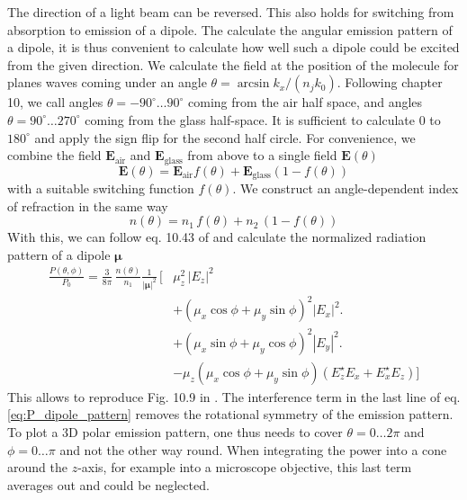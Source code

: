 The direction of  a light beam can be reversed. This also holds for switching from absorption to emission of a dipole. The calculate the angular emission pattern of a dipole, it is thus convenient to calculate how well such a dipole could be excited from the given direction. We calculate the field at the position of the molecule for planes waves coming under an angle $\theta = \arcsin k_x / (n_j k_0)$. Following \cite{Novotny-Hecht2012} chapter 10, we call angles $\theta = -90^\circ \dots 90^\circ$ coming from the air half space, and angles $\theta = 90^\circ \dots 270^\circ$ coming from the glass half-space. It is sufficient to calculate $0$ to $180^\circ$ and apply the sign flip for the second half circle. For convenience, we combine the field $\mathbf{E}_\text{air}$ and $\mathbf{E}_\text{glass}$ from above to a single field $\mathbf{E}(\theta)$
\begin{equation}
\mathbf{E}(\theta) = \mathbf{E}_\text{air} f(\theta) + \mathbf{E}_\text{glass} (1 - f(\theta))
\end{equation}
with a suitable switching function $f(\theta)$. We construct an angle-dependent index of refraction in the same way
\begin{equation}
n(\theta) =n_1 \,  f(\theta) + n_2 \, (1 - f(\theta))
\end{equation}
With this, we can follow eq. 10.43 of \cite{Novotny-Hecht2012} and calculate the normalized radiation pattern of a dipole $\mathbf{\mu}$
\begin{align} \label{eq:P_dipole_pattern}
\frac{P(\theta, \phi)}{P_0} = 
\frac{3}{8 \pi} \, \frac{n(\theta)}{n_1} \frac{1}{|\mathbf{\mu}|^2} \, 
\biggl[ 
& \mu_z^2 \, | E_z | ^2   \\
& + ( \mu_x \cos \phi + \mu_y \sin \phi)^2 | E_x | ^2  \biggl. \nonumber \\
& + ( \mu_x \sin \phi + \mu_y \cos \phi)^2 | E_y | ^2 \biggl. \nonumber \\
&  - \mu_z ( \mu_x \cos \phi + \mu_y \sin \phi) ( E_z^\star E_x + E_x^\star E_z)  \biggr] \nonumber 
\end{align}
This allows to reproduce Fig. 10.9 in \cite{Novotny-Hecht2012}. The interference term in the last line of eq. \ref{eq:P_dipole_pattern} removes the rotational symmetry of  the emission pattern. To plot a 3D polar emission pattern, one thus needs to cover $\theta = 0 \dots 2 \pi$ and $\phi = 0 \dots \pi$ and not the other way round. When integrating the power into a cone around the $z$-axis, for example into a microscope objective, this last term averages out and could be neglected.



